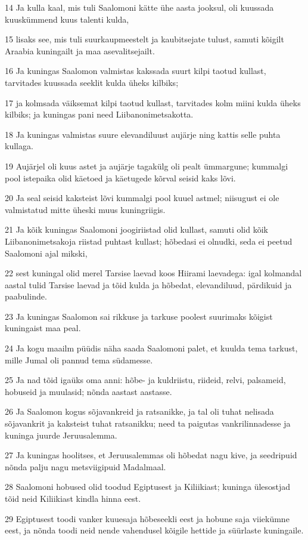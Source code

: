 \par 14 Ja kulla kaal, mis tuli Saalomoni kätte ühe aasta jooksul, oli kuussada kuuskümmend kuus talenti kulda,
\par 15 lisaks see, mis tuli suurkaupmeestelt ja kaubitsejate tulust, samuti kõigilt Araabia kuningailt ja maa asevalitsejailt.
\par 16 Ja kuningas Saalomon valmistas kakssada suurt kilpi taotud kullast, tarvitades kuussada seeklit kulda üheks kilbiks;
\par 17 ja kolmsada väiksemat kilpi taotud kullast, tarvitades kolm miini kulda üheks kilbiks; ja kuningas pani need Liibanonimetsakotta.
\par 18 Ja kuningas valmistas suure elevandiluust aujärje ning kattis selle puhta kullaga.
\par 19 Aujärjel oli kuus astet ja aujärje tagakülg oli pealt ümmargune; kummalgi pool istepaika olid käetoed ja käetugede kõrval seisid kaks lõvi.
\par 20 Ja seal seisid kaksteist lõvi kummalgi pool kuuel astmel; niisugust ei ole valmistatud mitte üheski muus kuningriigis.
\par 21 Ja kõik kuningas Saalomoni joogiriistad olid kullast, samuti olid kõik Liibanonimetsakoja riistad puhtast kullast; hõbedasi ei olnudki, seda ei peetud Saalomoni ajal mikski,
\par 22 sest kuningal olid merel Tarsise laevad koos Hiirami laevadega: igal kolmandal aastal tulid Tarsise laevad ja tõid kulda ja hõbedat, elevandiluud, pärdikuid ja paabulinde.
\par 23 Ja kuningas Saalomon sai rikkuse ja tarkuse poolest suurimaks kõigist kuningaist maa peal.
\par 24 Ja kogu maailm püüdis näha saada Saalomoni palet, et kuulda tema tarkust, mille Jumal oli pannud tema südamesse.
\par 25 Ja nad tõid igaüks oma anni: hõbe- ja kuldriistu, riideid, relvi, palsameid, hobuseid ja muulasid; nõnda aastast aastasse.
\par 26 Ja Saalomon kogus sõjavankreid ja ratsanikke, ja tal oli tuhat nelisada sõjavankrit ja kaksteist tuhat ratsanikku; need ta paigutas vankrilinnadesse ja kuninga juurde Jeruusalemma.
\par 27 Ja kuningas hoolitses, et Jeruusalemmas oli hõbedat nagu kive, ja seedripuid nõnda palju nagu metsviigipuid Madalmaal.
\par 28 Saalomoni hobused olid toodud Egiptusest ja Kiliikiast; kuninga ülesostjad tõid neid Kiliikiast kindla hinna eest.
\par 29 Egiptusest toodi vanker kuuesaja hõbeseekli eest ja hobune saja viiekümne eest, ja nõnda toodi neid nende vahendusel kõigile hettide ja süürlaste kuningaile.

